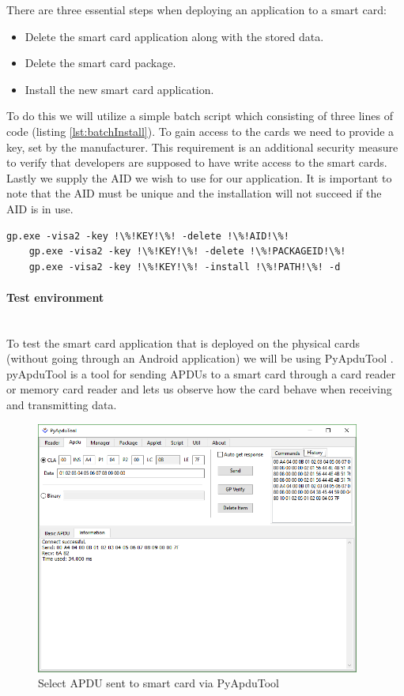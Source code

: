 There are three essential steps when deploying an application to a smart card:
\begin{itemize}
    \item Delete the smart card application along with the stored data.
    \item Delete the smart card package.
    \item Install the new smart card application.
\end{itemize}

To do this we will utilize a simple batch script which consisting of three lines of code (listing \ref{lst:batchInstall}). To gain access to the cards we need to provide a key, set by the manufacturer. This requirement is an additional security measure to verify that developers are supposed to have write access to the smart cards. Lastly we supply the AID we wish to use for our application. It is important to note that the AID must be unique and the installation will not succeed if the AID is in use.

\begin{lstlisting}[language=batch,caption=Install and deploy script for GlobalPlatformPro., label=lst:batchInstall,escapechar=!]
    gp.exe -visa2 -key !\%!KEY!\%! -delete !\%!AID!\%!
    gp.exe -visa2 -key !\%!KEY!\%! -delete !\%!PACKAGEID!\%!
    gp.exe -visa2 -key !\%!KEY!\%! -install !\%!PATH!\%! -d
\end{lstlisting}

\paragraph{Test environment}\mbox{}\\
To test the smart card application that is deployed on the physical cards (without going through an Android application) we will be using PyApduTool \cite{pyapdutool}. pyApduTool is a tool for sending APDUs to a smart card through a card reader or memory card reader and lets us observe how the card behave when receiving and transmitting data.

\begin{figure}[h!]
  \caption{Select APDU sent to smart card via PyApduTool}
  \label{fig:pyapdutool}
  \centering
    \includegraphics[width=0.95\textwidth]{images/pyapdutool.png}
\end{figure}

